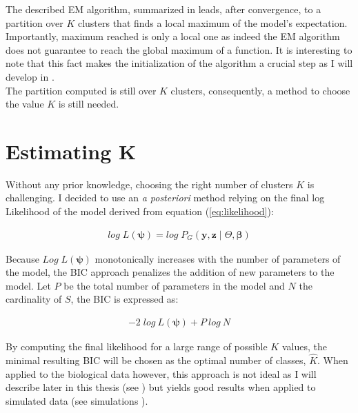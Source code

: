 The described EM algorithm, summarized in  leads, after convergence, to a partition over $K$ clusters that finds a local maximum of the model's expectation. Importantly, maximum reached is only a local one as indeed the EM algorithm does not guarantee to reach the global maximum of a function. It is interesting to note that this fact makes the initialization of the algorithm a crucial step as I will develop in .\\

The partition computed is still over $K$ clusters, consequently, a method to choose the value $K$ is still needed.

\section{Estimating K}
Without any prior knowledge, choosing the right number of clusters $K$ is challenging. I decided to use an {\it{a posteriori}} method relying on the final log Likelihood of the model derived from equation (\ref{eq:likelihood}):

\begin{align*}
log\;L(\boldsymbol{\psi}) = 	log\;P_G(\boldsymbol{y},\boldsymbol{z} \mid \Theta, \boldsymbol{\beta})
\end{align*}

Because $Log\;L(\boldsymbol{\psi})$ monotonically increases with the number of parameters of the model, the BIC approach penalizes the addition of new parameters to the model. Let $P$ be the total number of parameters in the model and $N$ the cardinality of $S$, the BIC is expressed as:

\begin{align*}
\label{eq:BIC}
- 2\; log\:L(\boldsymbol{\psi}) + P\:log\:N
\end{align*}

By computing the final likelihood for a large range of possible $K$ values, the minimal resulting BIC will be chosen as the optimal number of classes, $\hat{K}$. When applied to the biological data however, this approach is not ideal as I will describe later in this thesis (see ) but yields good results when applied to simulated data (see simulations ).\\

